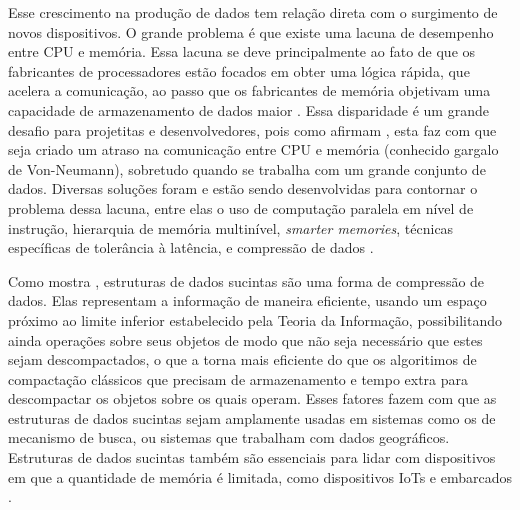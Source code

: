 Esse crescimento na produção de dados tem relação direta com o surgimento de novos dispositivos. O grande problema é que existe uma lacuna de
desempenho entre CPU e memória. Essa lacuna se deve principalmente ao fato de que os fabricantes de processadores estão focados em obter uma lógica rápida,  que acelera a comunicação, ao passo que os fabricantes de memória objetivam uma capacidade de armazenamento de dados maior \citep{paper-processor-memory-bottleneck}. Essa disparidade é um grande desafio para projetitas e desenvolvedores, pois como afirmam \citet{paper-processor-memory-bottleneck},  esta faz com que seja criado um atraso na comunicação entre CPU e memória (conhecido gargalo de Von-Neumann), sobretudo quando se trabalha com um grande conjunto de dados. Diversas soluções foram e estão sendo desenvolvidas para contornar o problema dessa lacuna, entre elas o uso de computação paralela em nível de instrução, hierarquia de memória multinível, \textit{smarter memories}, técnicas específicas de tolerância à latência, e compressão de dados \citep{paper-Processor-Memory-bottleneck-Problems-Solutions, paper-processor-memory-bottleneck}.

Como mostra \cite{book-compact-data-structures}, estruturas de dados sucintas são uma forma de compressão de dados. Elas representam a informação de maneira eficiente, usando um espaço próximo ao limite inferior estabelecido pela Teoria da Informação, possibilitando ainda operações sobre seus objetos de modo que não seja necessário que estes sejam descompactados, o que a torna mais eficiente do que os algoritimos de compactação  clássicos que precisam de armazenamento e tempo extra para descompactar os objetos sobre os quais operam.  Esses fatores fazem com que as estruturas de dados sucintas sejam amplamente usadas em sistemas como os de mecanismo de busca,  ou sistemas que trabalham com dados geográficos. Estruturas de dados sucintas também são essenciais para lidar  com dispositivos em que a quantidade de memória é limitada, como  dispositivos IoTs e embarcados \citep{book-compact-data-structures}. %

